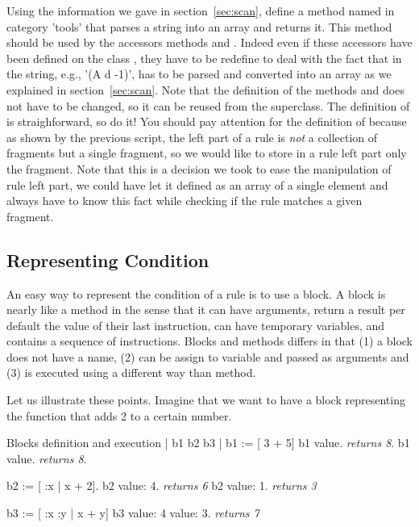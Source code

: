 Using the information we gave in section~\ref{sec:scan}, define a
method named  in category 'tools' that parses a
string into an array and returns it. This method should be used by the
accessors methods  and .  Indeed even if
these accessors have been defined on the class , they have
to be redefine to deal with the fact that in  the
string, e.g., '(A d -1)', has to be parsed and converted into an array
as we explained in section~\ref{sec:scan}. Note that the definition of
the methods  and  does not have to be
changed, so it can be reused from the superclass. The definition of
 is straighforward, so do it!
You should pay attention for the definition of  because
as shown by the previous script, the left part of a rule is \emph{not}
a collection of fragments but a single fragment, so we would like to
store in a rule left part only the fragment. Note that this is a
decision we took to ease the manipulation of rule left part, we could
have let it defined as an array of a single element and always have to
know this fact while checking if the rule matches a given fragment.


\subsection{Representing Condition}
An easy way to represent the condition of a rule is to use a block.  A
block is nearly like a method in the sense that it can have arguments,
return a result per default the value of their last instruction, can
have temporary variables, and contains a sequence of
instructions. Blocks and methods differs in that (1) a block does not
have a name, (2) can be assign to variable and passed as arguments and
(3) is executed using a different way than method.

Let us illustrate these points. Imagine that we want to have a block
representing the function that adds 2 to a certain number. 
\begin{scriptwithtitle}{Blocks definition and execution}
| b1 b2 b3 |
b1 := [ 3 + 5]
b1 value.
\emph{returns 8}.
b1 value.
\emph{returns 8}.

b2 := [ :x | x + 2].
b2 value: 4.
\emph{returns 6}
b2 value: 1.
\emph{returns 3}

b3 := [ :x :y | x + y]
b3 value: 4 value: 3.
\emph{returns 7}
\end{scriptwithtitle}

